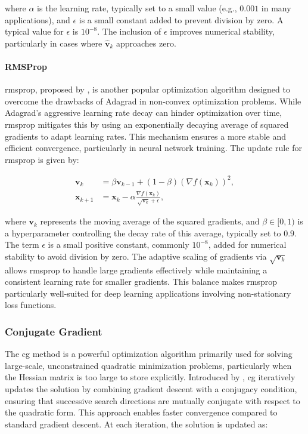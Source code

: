 \noindent where $\alpha$ is the learning rate, typically set to a small value (e.g., $0.001$ in many applications), and $\epsilon$ is a small constant added to prevent division by zero. A typical value for $\epsilon$ is $10^{-8}$. The inclusion of $\epsilon$ improves numerical stability, particularly in cases where $\hat{\mathbf{v}}_k$ approaches zero.

\paragraph{RMSProp}
\label{paragraph:rmsprop}
\ac{rmsprop}, proposed by \citet{tieleman2012lecture}, is another popular optimization algorithm designed to overcome the drawbacks of Adagrad in non-convex optimization problems. While Adagrad's aggressive learning rate decay can hinder optimization over time, \ac{rmsprop} mitigates this by using an exponentially decaying average of squared gradients to adapt learning rates. This mechanism ensures a more stable and efficient convergence, particularly in neural network training. The update rule for \ac{rmsprop} is given by:

\begin{align*}
\mathbf{v}_k &= \beta \mathbf{v}_{k-1} + (1 - \beta) (\nabla f(\mathbf{x}_k))^2, \\
\mathbf{x}_{k+1} &= \mathbf{x}_k - \alpha \frac{\nabla f(\mathbf{x}_k)}{\sqrt{\mathbf{v}_k} + \epsilon},
\end{align*}

\noindent where $\mathbf{v}_k$ represents the moving average of the squared gradients, and $\beta \in [0, 1)$ is a hyperparameter controlling the decay rate of this average, typically set to $0.9$. The term $\epsilon$ is a small positive constant, commonly $10^{-8}$, added for numerical stability to avoid division by zero. The adaptive scaling of gradients via $\sqrt{\mathbf{v}_k}$ allows \ac{rmsprop} to handle large gradients effectively while maintaining a consistent learning rate for smaller gradients. This balance makes \ac{rmsprop} particularly well-suited for deep learning applications involving non-stationary loss functions.


\subsubsection{Conjugate Gradient}
\label{subsubsection:conjugate_gradient}

The \ac{cg} method is a powerful optimization algorithm primarily used for solving large-scale, unconstrained quadratic minimization problems, particularly when the Hessian matrix is too large to store explicitly. Introduced by \citet{hestenes1952methods}, \ac{cg} iteratively updates the solution by combining gradient descent with a conjugacy condition, ensuring that successive search directions are mutually conjugate with respect to the quadratic form. This approach enables faster convergence compared to standard gradient descent. At each iteration, the solution is updated as:

